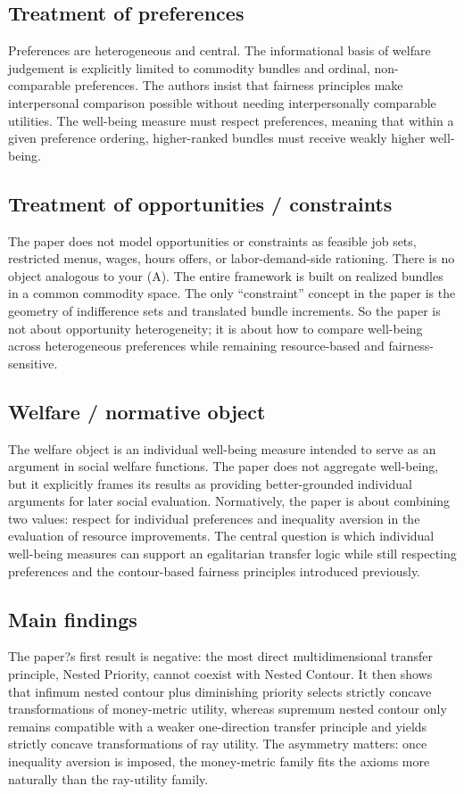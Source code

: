 \documentclass[11pt,a4paper]{article}
\begin{document}
\subsection*{Treatment of preferences}
Preferences are heterogeneous and central. The informational basis of welfare judgement is explicitly limited to commodity bundles and ordinal, non-comparable preferences. The authors insist that fairness principles make interpersonal comparison possible without needing interpersonally comparable utilities. The well-being measure must respect preferences, meaning that within a given preference ordering, higher-ranked bundles must receive weakly higher well-being.

\subsection*{Treatment of opportunities / constraints}
The paper does not model opportunities or constraints as feasible job sets, restricted menus, wages, hours offers, or labor-demand-side rationing. There is no object analogous to your (A). The entire framework is built on realized bundles in a common commodity space. The only “constraint” concept in the paper is the geometry of indifference sets and translated bundle increments. So the paper is not about opportunity heterogeneity; it is about how to compare well-being across heterogeneous preferences while remaining resource-based and fairness-sensitive.

\subsection*{Welfare / normative object}
The welfare object is an individual well-being measure intended to serve as an argument in social welfare functions. The paper does not aggregate well-being, but it explicitly frames its results as providing better-grounded individual arguments for later social evaluation. Normatively, the paper is about combining two values: respect for individual preferences and inequality aversion in the evaluation of resource improvements. The central question is which individual well-being measures can support an egalitarian transfer logic while still respecting preferences and the contour-based fairness principles introduced previously.

\subsection*{Main findings}
The paper?s first result is negative: the most direct multidimensional transfer principle, Nested Priority, cannot coexist with Nested Contour. It then shows that infimum nested contour plus diminishing priority selects strictly concave transformations of money-metric utility, whereas supremum nested contour only remains compatible with a weaker one-direction transfer principle and yields strictly concave transformations of ray utility. The asymmetry matters: once inequality aversion is imposed, the money-metric family fits the axioms more naturally than the ray-utility family.
\end{document}
